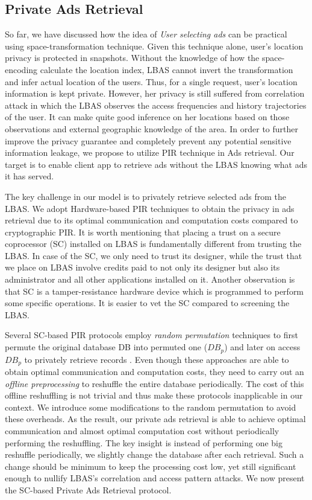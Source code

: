 \subsection{Private Ads Retrieval} 
\label{subsec:PIR}
So far, we have discussed how the idea of \textit{User selecting ads} can be practical using space-transformation technique. Given this technique alone, user's location privacy is protected in snapshots. Without the knowledge of how the space-encoding calculate the location index, LBAS cannot invert the transformation and infer actual location of the users. Thus, for a single request, user's location information is kept private. However, her privacy is still suffered from correlation attack in which the LBAS observes the access frequencies and history trajectories of the user. It can make quite good inference on her locations based on those observations and external geographic knowledge of the area. In order to further improve the privacy guarantee and completely prevent any potential sensitive information leakage, we propose to utilize PIR technique in Ads retrieval. Our target is to enable client app to retrieve ads without the LBAS knowing what ads it has served.

The key challenge in our model is to privately retrieve selected ads from the LBAS. We adopt Hardware-based PIR techniques to obtain the privacy in ads retrieval due to its optimal communication and computation costs compared to cryptographic PIR. It is worth mentioning that placing a trust on a secure coprocessor (SC) installed on LBAS is fundamentally different from trusting the LBAS. In case of the SC, we only need to trust its designer, while the trust that we place on LBAS involve credits paid to not only its designer but also its administrator and all other applications installed on it. Another observation is that SC is a tamper-resistance hardware device which is programmed to perform some specific operations. It is easier to vet the SC compared to screening the LBAS.

Several SC-based PIR protocols employ \textit{random permutation} techniques to first permute the original database DB into permuted one ($DB_p$) and later on access $DB_p$ to privately retrieve records \cite{PIR_SC_2006, PIR_SC_betterShuffling, PIR_SC_betterShuffling_2008}. Even though these approaches are able to obtain optimal communication and computation costs, they need to carry out an \textit{offline preprocessing} to reshuffle the entire database periodically. The cost of this offline reshuffling is not trivial and thus make these protocols inapplicable in our context. We introduce some modifications to the random permutation to avoid these overheads. As the result, our private ads retrieval is able to achieve optimal communication and almost optimal computation cost without periodically performing the reshuffling. 
The key insight is instead of performing one big reshuffle periodically, we slightly change the database after each retrieval. Such a change should be minimum to keep the processing cost low, yet still significant enough to nullify LBAS's correlation and access pattern attacks. We now present the SC-based Private Ads Retrieval protocol.

